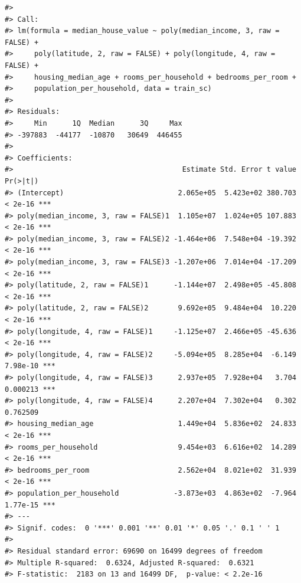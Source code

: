 \documentclass[
]{article}
\begin{document}
\begin{verbatim}
#> 
#> Call:
#> lm(formula = median_house_value ~ poly(median_income, 3, raw = FALSE) + 
#>     poly(latitude, 2, raw = FALSE) + poly(longitude, 4, raw = FALSE) + 
#>     housing_median_age + rooms_per_household + bedrooms_per_room + 
#>     population_per_household, data = train_sc)
#> 
#> Residuals:
#>     Min      1Q  Median      3Q     Max 
#> -397883  -44177  -10870   30649  446455 
#> 
#> Coefficients:
#>                                        Estimate Std. Error t value Pr(>|t|)    
#> (Intercept)                           2.065e+05  5.423e+02 380.703  < 2e-16 ***
#> poly(median_income, 3, raw = FALSE)1  1.105e+07  1.024e+05 107.883  < 2e-16 ***
#> poly(median_income, 3, raw = FALSE)2 -1.464e+06  7.548e+04 -19.392  < 2e-16 ***
#> poly(median_income, 3, raw = FALSE)3 -1.207e+06  7.014e+04 -17.209  < 2e-16 ***
#> poly(latitude, 2, raw = FALSE)1      -1.144e+07  2.498e+05 -45.808  < 2e-16 ***
#> poly(latitude, 2, raw = FALSE)2       9.692e+05  9.484e+04  10.220  < 2e-16 ***
#> poly(longitude, 4, raw = FALSE)1     -1.125e+07  2.466e+05 -45.636  < 2e-16 ***
#> poly(longitude, 4, raw = FALSE)2     -5.094e+05  8.285e+04  -6.149 7.98e-10 ***
#> poly(longitude, 4, raw = FALSE)3      2.937e+05  7.928e+04   3.704 0.000213 ***
#> poly(longitude, 4, raw = FALSE)4      2.207e+04  7.302e+04   0.302 0.762509    
#> housing_median_age                    1.449e+04  5.836e+02  24.833  < 2e-16 ***
#> rooms_per_household                   9.454e+03  6.616e+02  14.289  < 2e-16 ***
#> bedrooms_per_room                     2.562e+04  8.021e+02  31.939  < 2e-16 ***
#> population_per_household             -3.873e+03  4.863e+02  -7.964 1.77e-15 ***
#> ---
#> Signif. codes:  0 '***' 0.001 '**' 0.01 '*' 0.05 '.' 0.1 ' ' 1
#> 
#> Residual standard error: 69690 on 16499 degrees of freedom
#> Multiple R-squared:  0.6324, Adjusted R-squared:  0.6321 
#> F-statistic:  2183 on 13 and 16499 DF,  p-value: < 2.2e-16
\end{verbatim}
\end{document}

